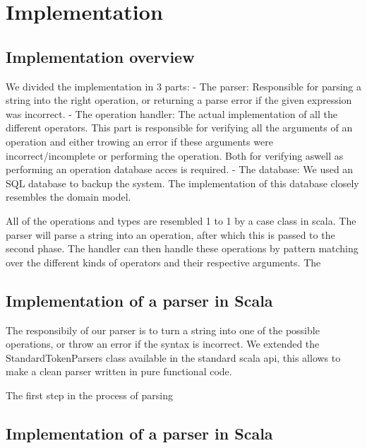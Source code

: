 \section{Implementation}

\subsection{Implementation overview}

We divided the implementation in 3 parts:
- The parser:
	Responsible for parsing a string into the right operation,
	or returning a parse error if the given expression was incorrect.
- The operation handler:
	The actual implementation of all the different operators.
	This part is responsible for verifying all the arguments of an operation
	and either trowing an error if these arguments were incorrect/incomplete or
	performing the operation. Both for verifying aswell as performing an operation
	database acces is required.
- The database:
	We used an SQL database to backup the system. The implementation of this
	database closely resembles the domain model.
	
All of the operations and types are resembled 1 to 1 by a case class in scala.
The parser will parse a string into an operation, after which this is passed
to the second phase. The handler can then handle these operations by pattern
matching over the different kinds of operators and their respective arguments.
The 

\subsection{Implementation of a parser in Scala}

The responsibily of our parser is to turn a string into one of the possible
operations, or throw an error if the syntax is incorrect. We extended the
StandardTokenParsers class available in the standard scala api, this allows to
make a clean parser written in pure functional code.

The first step in the process of parsing 



\subsection{Implementation of a parser in Scala}
